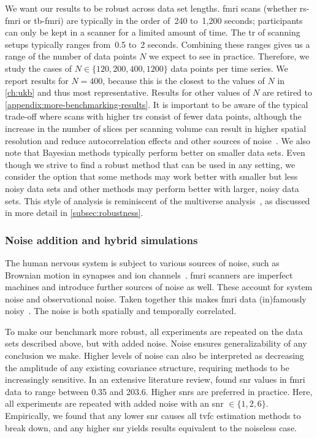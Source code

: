 We want our results to be robust across data set lengths.
\gls{fmri} scans (whether \gls{rs-fmri} or \gls{tb-fmri}) are typically in the order of~240 to~1,200 seconds; participants can only be kept in a scanner for a limited amount of time.
The \gls{tr} of scanning setups typically ranges from~0.5 to~2 seconds.
Combining these ranges gives us a range of the number of data points $N$ we expect to see in practice.
Therefore, we study the cases of $N \in \{120, 200, 400, 1200\}$ data points per time series.
We report results for $N = 400$, because this is the closest to the values of $N$ in \cref{ch:ukb} and thus most representative.
Results for other values of $N$ are retired to \cref{appendix:more-benchmarking-results}.
It is important to be aware of the typical trade-off where scans with higher \glspl{tr} consist of fewer data points, although the increase in the number of slices per scanning volume can result in higher spatial resolution and reduce autocorrelation effects and other sources of noise~\parencite{Amaro2006, Iranpour2015, Yoo2018, McDowell2019}.
We also note that Bayesian methods typically perform better on smaller data sets.
Even though we strive to find a robust method that can be used in any setting, we consider the option that some methods may work better with smaller but less noisy data sets and other methods may perform better with larger, noisy data sets.
This style of analysis is reminiscent of the multiverse analysis~\parencite{Steegen2016}, as discussed in more detail in \cref{subsec:robustness}.

\subsubsection{Noise addition and hybrid simulations}

The human nervous system is subject to various sources of noise, such as Brownian motion in synapses and ion channels~\parencite{Faisal2008}.
\gls{fmri} scanners are imperfect machines and introduce further sources of noise as well.
These account for system noise and observational noise.
Taken together this makes \gls{fmri} data (in)famously noisy~\parencite[see also][for analysis and biophysical simulations of the impact of noise and delay]{Deco2009}.
The noise is both spatially and temporally correlated.

To make our benchmark more robust, all experiments are repeated on the data sets described above, but with added noise.
Noise ensures generalizability of any conclusion we make.
Higher levels of noise can also be interpreted as decreasing the amplitude of any existing covariance structure, requiring methods to be increasingly sensitive.
In an extensive literature review, \textcite{Welvaert2013} found \gls{snr} values in \gls{fmri} data to range between 0.35 and 203.6.
Higher \glspl{snr} are preferred in practice.
%
Here, all experiments are repeated with added noise with an \gls{snr} $\in \{1, 2, 6\}$.
Empirically, we found that any lower \gls{snr} causes all \gls{tvfc} estimation methods to break down, and any higher \gls{snr} yields results equivalent to the noiseless case.

